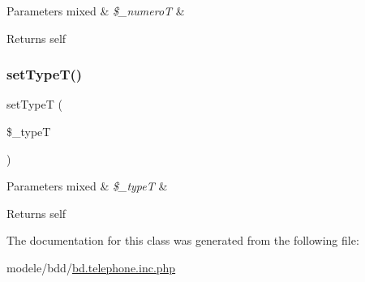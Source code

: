 \begin{DoxyParams}[1]{Parameters}
mixed & {\em \$\+\_\+numeroT} & \\
\hline
\end{DoxyParams}
\begin{DoxyReturn}{Returns}
self 
\end{DoxyReturn}
\mbox{\label{class_telephone_a43286b238b0c8302ab1a44414a7a1302}} 
\subsubsection{\texorpdfstring{set\+Type\+T()}{setTypeT()}}
{\footnotesize\ttfamily set\+TypeT (\begin{DoxyParamCaption}\item[{}]{\$\+\_\+typeT }\end{DoxyParamCaption})}


\begin{DoxyParams}[1]{Parameters}
mixed & {\em \$\+\_\+typeT} & \\
\hline
\end{DoxyParams}
\begin{DoxyReturn}{Returns}
self 
\end{DoxyReturn}


The documentation for this class was generated from the following file\+:\begin{DoxyCompactItemize}
\item 
modele/bdd/\hyperlink{bd_8telephone_8inc_8php}{bd.\+telephone.\+inc.\+php}\end{DoxyCompactItemize}
